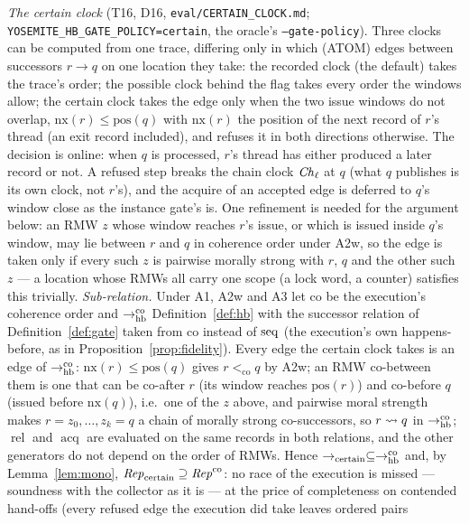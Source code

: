 \documentclass[11pt]{article}
\theoremstyle{remark}
\DeclareMathOperator{\rel}{rel}\DeclareMathOperator{\acq}{acq}\DeclareMathOperator{\key}{key}
\begin{document}
\emph{The certain clock} (T16, D16, \texttt{eval/CERTAIN\_CLOCK.md};
\texttt{YOSEMITE\_HB\_GATE\_POLICY=certain}, the oracle's \texttt{--gate-policy}). Three clocks
can be computed from one trace, differing only in which (ATOM) edges between successors
$r\to q$ on one location they take: the recorded clock (the default) takes the trace's order;
the possible clock behind the flag takes every order the windows allow; the certain clock
takes the edge only when the two issue windows do not overlap, $\mathrm{nx}(r)\le\mathrm{pos}(q)$
with $\mathrm{nx}(r)$ the position of the next record of $r$'s thread (an exit record included),
and refuses it in both directions otherwise. The decision is online: when $q$ is processed,
$r$'s thread has either produced a later record or not. A refused step breaks the chain clock
$\mathit{Ch}_\ell$ at $q$ (what $q$ publishes is its own clock, not $r$'s), and the acquire of an
accepted edge is deferred to $q$'s window close as the instance gate's is. One refinement is
needed for the argument below: an RMW $z$ whose window reaches $r$'s issue, or which is issued
inside $q$'s window, may lie between $r$ and $q$ in coherence order under A2w, so the edge is
taken only if every such $z$ is pairwise morally strong with $r$, $q$ and the other such $z$ --- a
location whose RMWs all carry one scope (a lock word, a counter) satisfies this trivially.
\emph{Sub-relation.} Under A1, A2w and A3 let $\mathrm{co}$ be the execution's coherence order
and $\to_{\mathrm{hb}}^{\mathrm{co}}$ Definition~\ref{def:hb} with the successor relation of
Definition~\ref{def:gate} taken from $\mathrm{co}$ instead of $\operatorname{seq}$ (the execution's own
happens-before, as in Proposition~\ref{prop:fidelity}). Every edge the certain clock takes is
an edge of $\to_{\mathrm{hb}}^{\mathrm{co}}$: $\mathrm{nx}(r)\le\mathrm{pos}(q)$ gives $r<_{\mathrm{co}}q$ by
A2w; an RMW $\mathrm{co}$-between them is one that can be $\mathrm{co}$-after $r$ (its window
reaches $\mathrm{pos}(r)$) and $\mathrm{co}$-before $q$ (issued before $\mathrm{nx}(q)$), i.e.\ one
of the $z$ above, and pairwise moral strength makes $r=z_0,\dots,z_k=q$ a chain of morally
strong $\mathrm{co}$-successors, so $r\rightsquigarrow q$ in $\to_{\mathrm{hb}}^{\mathrm{co}}$; $\rel$ and $\acq$ are
evaluated on the same records in both relations, and the other generators do not depend on
the order of RMWs. Hence $\to_{\mathrm{certain}}\subseteq\to_{\mathrm{hb}}^{\mathrm{co}}$ and, by
Lemma~\ref{lem:mono}, $\mathit{Rep}_{\mathrm{certain}}\supseteq\mathit{Rep}^{\mathrm{co}}$: no race of the
execution is missed --- soundness with the collector as it is --- at the price of completeness
on contended hand-offs (every refused edge the execution did take leaves ordered pairs
\end{document}
